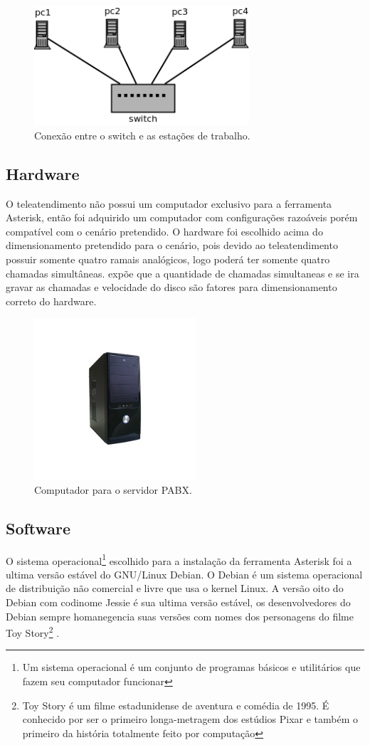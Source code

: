 \begin{figure}[h]
	\centering
	\includegraphics[width=8cm]{imagens/switch.png}
	\caption{Conexão entre o switch e as estações de trabalho.}
    \label{Figura17}
\end{figure}

\subsection{Hardware}
O teleatendimento não possui um computador exclusivo para a ferramenta Asterisk, então foi adquirido um computador com configurações razoáveis porém compatível com o cenário pretendido. O hardware foi escolhido acima do dimensionamento pretendido para o cenário, pois devido ao teleatendimento possuir somente quatro ramais analógicos, logo poderá ter somente quatro chamadas simultâneas.  expõe que a quantidade de chamadas simultaneas e se ira gravar as chamadas e velocidade do disco são fatores para dimensionamento correto do hardware. 

\begin{figure}[h]
	\centering
	\includegraphics[width=6cm]{imagens/gabinete.jpg}
	\caption{Computador para o servidor PABX.}
    \label{Figura18}
\end{figure}

\subsection{Software}
O sistema operacional\footnote{Um sistema operacional é um conjunto de programas básicos e utilitários que fazem seu computador funcionar} escolhido para a instalação da ferramenta Asterisk foi a ultima versão estável do GNU/Linux Debian. O Debian é um sistema operacional de distribuição não comercial e livre que usa o kernel Linux. A versão oito do Debian com codinome Jessie é sua ultima versão estável, os desenvolvedores do Debian sempre homanegencia suas versões com nomes dos personagens do filme Toy Story\footnote{Toy Story é um filme estadunidense de aventura e comédia de 1995. É conhecido por ser o primeiro longa-metragem dos estúdios Pixar e também o primeiro da história totalmente feito por computação} \cite{valessiosoaresbrito2015}.

